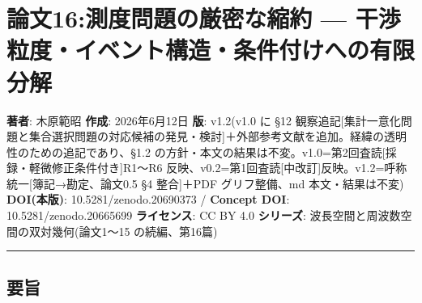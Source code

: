 \documentclass[
]{ltjsarticle}
\author{}
\date{}
\begin{document}
\section{論文16:測度問題の厳密な縮約 ---
干渉粒度・イベント構造・条件付けへの有限分解}\label{ux8ad6ux658716ux6e2cux5ea6ux554fux984cux306eux53b3ux5bc6ux306aux7e2eux7d04-ux5e72ux6e09ux7c92ux5ea6ux30a4ux30d9ux30f3ux30c8ux69cbux9020ux6761ux4ef6ux4ed8ux3051ux3078ux306eux6709ux9650ux5206ux89e3}

\textbf{著者}: 木原範昭 \textbf{作成}: 2026年6月12日 \textbf{版}:
v1.2(v1.0 に §12
観察追記{[}集計一意化問題と集合選択問題の対応候補の発見・検討{]}＋外部参考文献を追加。経緯の透明性のための追記であり、§1.2
の方針・本文の結果は不変。v1.0=第2回査読{[}採録・軽微修正条件付き{]}R1〜R6
反映、v0.2=第1回査読{[}中改訂{]}反映。v1.2=呼称統一{[}簿記→勘定、論文0.5
§4 整合{]}＋PDF グリフ整備、md 本文・結果は不変) \textbf{DOI(本版)}:
10.5281/zenodo.20690373 / \textbf{Concept DOI}: 10.5281/zenodo.20665699
\textbf{ライセンス}: CC BY 4.0 \textbf{シリーズ}:
波長空間と周波数空間の双対幾何(論文1〜15 の続編、第16篇)

\begin{center}\rule{0.5\linewidth}{0.5pt}\end{center}

\subsection{要旨}\label{ux8981ux65e8}
\end{document}
